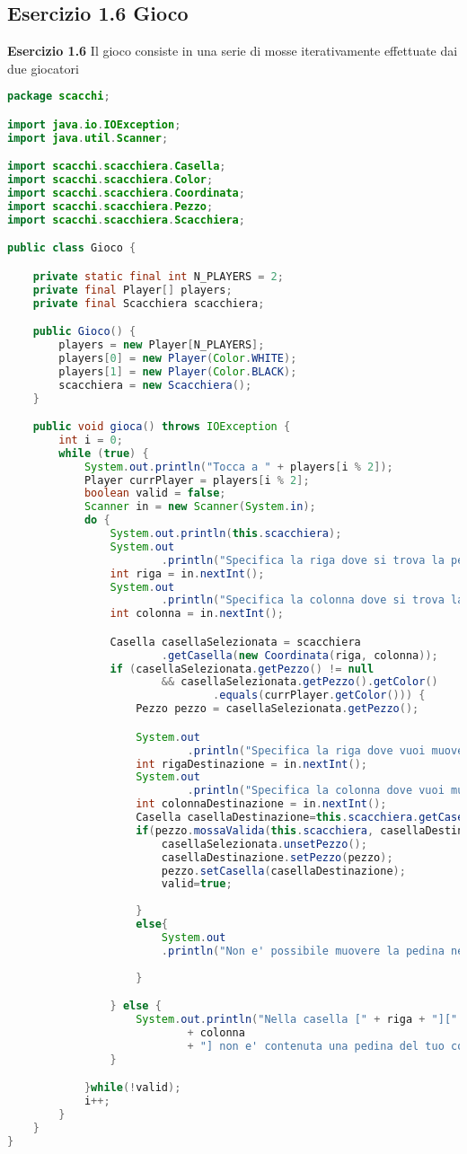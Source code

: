 \documentclass{article}
\begin{document}
\subsection{Esercizio 1.6 Gioco}
\begin{framed}
\textbf{Esercizio 1.6} Il gioco consiste in una serie di mosse iterativamente effettuate dai due giocatori
\end{framed}
\begin{lstlisting}[language=Java,escapechar=|]
package scacchi;

import java.io.IOException;
import java.util.Scanner;

import scacchi.scacchiera.Casella;
import scacchi.scacchiera.Color;
import scacchi.scacchiera.Coordinata;
import scacchi.scacchiera.Pezzo;
import scacchi.scacchiera.Scacchiera;

public class Gioco {

	private static final int N_PLAYERS = 2;
	private final Player[] players;
	private final Scacchiera scacchiera;

	public Gioco() {
		players = new Player[N_PLAYERS];
		players[0] = new Player(Color.WHITE);
		players[1] = new Player(Color.BLACK);
		scacchiera = new Scacchiera();
	}

	public void gioca() throws IOException {
		int i = 0;
		while (true) {
			System.out.println("Tocca a " + players[i % 2]);
			Player currPlayer = players[i % 2];
			boolean valid = false;
			Scanner in = new Scanner(System.in);
			do {
				System.out.println(this.scacchiera);
				System.out
						.println("Specifica la riga dove si trova la pedina che vuoi muovere");
				int riga = in.nextInt();
				System.out
						.println("Specifica la colonna dove si trova la pedina che vuoi muovere");
				int colonna = in.nextInt();

				Casella casellaSelezionata = scacchiera
						.getCasella(new Coordinata(riga, colonna));
				if (casellaSelezionata.getPezzo() != null
						&& casellaSelezionata.getPezzo().getColor()
								.equals(currPlayer.getColor())) {
					Pezzo pezzo = casellaSelezionata.getPezzo();

					System.out
							.println("Specifica la riga dove vuoi muovere il pezzo");
					int rigaDestinazione = in.nextInt();
					System.out
							.println("Specifica la colonna dove vuoi muovere il pezzo");
					int colonnaDestinazione = in.nextInt();
					Casella casellaDestinazione=this.scacchiera.getCasella(new Coordinata(rigaDestinazione, colonnaDestinazione));
					if(pezzo.mossaValida(this.scacchiera, casellaDestinazione)){
						casellaSelezionata.unsetPezzo();
						casellaDestinazione.setPezzo(pezzo);
						pezzo.setCasella(casellaDestinazione);
						valid=true;
						
					}
					else{
						System.out
						.println("Non e' possibile muovere la pedina nella colonna specificata");
				
					}

				} else {
					System.out.println("Nella casella [" + riga + "]["
							+ colonna
							+ "] non e' contenuta una pedina del tuo colore");
				}

			}while(!valid);
        	i++;
		}
	}
}
\end{lstlisting}
\end{document}
